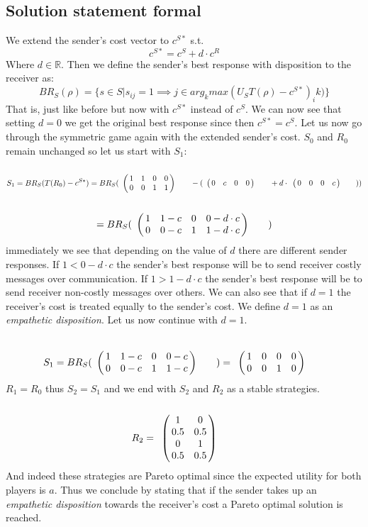 \documentclass[10]{article}
\begin{document}
\subsection{Solution statement formal}
We extend the sender's cost vector to $c^{S*}$ s.t. %
$$c^{S*}=c^{S} + d \cdot c^{R}$$
Where $d \in \mathbb{R}$. Then we define the sender's best response with disposition to the receiver as:
\begin{equation*}
BR_S(\rho)=\{s\in S | s_{ij}=1\implies j \in arg_kmax(U_S T(\rho)-c^{S*})_ik)\}
\end{equation*}
That is, just like before but now with $c^{S*}$ instead of $c^{S}$. We can now see that setting $d=0$ we get the original best response since then $c^{S*}=c^{S}$.
Let us now go through the symmetric game again with the extended sender's cost. $S_0$ and $R_0$ remain unchanged so let us start with $S_1$:
\begin{equation*}
S_1= BR_S(T(R_0)-c^{S*})=
BR_S(
\bordermatrix{
            & & & &    \cr
 &       1 &         1 & 0       & 0 \cr
 &       0 &         0 & 1      & 1
 }\qquad
-(
\bordermatrix{
            & & & &    \cr
 &       0 &         c & 0       & 0 \cr
 }\qquad
+ d \cdot
\bordermatrix{
            & & & &    \cr
 &       0 &         0 & 0       & c \cr
 }\qquad
 )
)
\end{equation*}
\begin{equation*}
=BR_S(
\bordermatrix{
                & & & &    \cr
     &       1 &         1-c & 0       & 0-d\cdot c \cr
     &       0 &         0-c & 1      & 1-d\cdot c
 }\qquad
 )
 \end{equation*}
immediately we see that depending on the value of $d$ there are different sender responses. If $1<0-d\cdot c$ the sender's best response will be to send receiver costly messages over communication.  If $1>1-d\cdot c$ the sender's best response will be to send receiver non-costly messages over others. We can also see that if $d=1$ the receiver's cost is treated equally to the sender's cost. We define $d=1$ as an \textit{empathetic disposition}. Let us now continue with $d=1$.

\begin{equation*}
S_1=BR_S(
\bordermatrix{
                & & & &    \cr
     &       1 &         1-c & 0       & 0-c \cr
     &       0 &         0-c & 1      & 1-c
 }\qquad
 )
=
\bordermatrix{
                & & & &    \cr
     &       1 &         0 & 0       & 0 \cr
     &       0 &         0 & 1      & 0
 }\qquad
 \end{equation*}
$R_1=R_0$ thus $S_2=S_1$ and we end with $S_2$ and $R_2$ as a stable strategies.
\begin{equation*}
  R_2= \bordermatrix{
              &  & \cr
      & 1 & 0 \cr
       & 0.5 & 0.5 \cr
       & 0 & 1 \cr
       & 0.5 & 0.5 \cr
   }\qquad
\end{equation*}
And indeed these strategies are Pareto optimal since the expected utility for both players is $a$. Thus we conclude by stating that if the sender takes up an \textit{empathetic disposition} towards the receiver's cost a Pareto optimal solution is reached.
\end{document}
